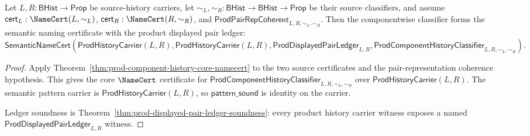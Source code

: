\begin{theorem}
\label{thm:prod-component-history-semantic-certificate-target}
Let $L,R:\mathsf{BHist}\to\mathsf{Prop}$ be source-history carriers, let
$\sim_L,\sim_R:\mathsf{BHist}\to\mathsf{BHist}\to\mathsf{Prop}$ be their source
classifiers, and assume $\mathsf{cert}_L:\NameCert(L,\sim_L)$,
$\mathsf{cert}_R:\NameCert(R,\sim_R)$, and
$\mathsf{ProdPairRepCoherent}_{L,R,\sim_L,\sim_R}$. Then the componentwise
classifier forms the semantic naming certificate with the product displayed pair
ledger:
$$
\mathsf{SemanticNameCert}(\mathsf{ProdHistoryCarrier}(L,R),
\mathsf{ProdHistoryCarrier}(L,R),
\mathsf{ProdDisplayedPairLedger}_{L,R},
\mathsf{ProdComponentHistoryClassifier}_{L,R,\sim_L,\sim_R}).
$$
\end{theorem}
\begin{proof}
Apply Theorem~\ref{thm:prod-component-history-core-namecert} to the two source
certificates and the pair-representation coherence hypothesis. This gives the
core $\NameCert$ certificate for
$\mathsf{ProdComponentHistoryClassifier}_{L,R,\sim_L,\sim_R}$ over
$\mathsf{ProdHistoryCarrier}(L,R)$.
The semantic pattern carrier is $\mathsf{ProdHistoryCarrier}(L,R)$, so
$\mathsf{pattern\_sound}$ is identity on the carrier.

Ledger soundness is Theorem~\ref{thm:prod-displayed-pair-ledger-soundness}: every
product history carrier witness exposes a named
$\mathsf{ProdDisplayedPairLedger}_{L,R}$ witness.
\end{proof}

